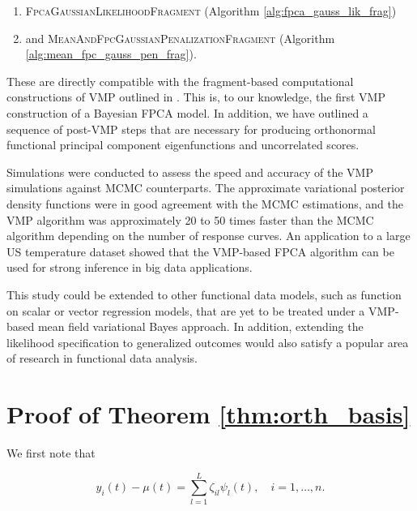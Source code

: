\documentclass[12pt]{article}
\theoremstyle{plain}
\theoremstyle{definition}
\theoremstyle{remark}
\begin{document}
\begin{enumerate}
	\item \textsc{FpcaGaussianLikelihoodFragment} (Algorithm \ref{alg:fpca_gauss_lik_frag})
	\item and \textsc{MeanAndFpcGaussianPenalizationFragment} (Algorithm \ref{alg:mean_fpc_gauss_pen_frag}).
\end{enumerate}

\noindent These are directly compatible with the fragment-based computational constructions of VMP outlined in
. This is, to our knowledge, the first VMP construction of a Bayesian FPCA model. In addition,
we have outlined a sequence of post-VMP steps that are necessary for producing orthonormal functional
principal component eigenfunctions and uncorrelated scores.

Simulations were conducted to assess the speed and accuracy of the VMP simulations against MCMC
counterparts. The approximate variational  posterior density functions were in good agreement with the
MCMC estimations, and the VMP algorithm was approximately 20 to 50 times faster than the MCMC
algorithm depending on the number of response curves. An application to a large US temperature dataset
showed that the VMP-based FPCA algorithm can be used for strong inference in big data applications.

This study could be extended to other
functional data models, such as function on scalar or vector regression models, that are yet to be treated
under a VMP-based mean field variational Bayes approach. In addition, extending the likelihood specification to
generalized outcomes would also satisfy a popular area of research in functional data analysis.





\appendix


\section{Proof of Theorem \ref{thm:orth_basis}}
\label{app:proof_thm_orth_basis}

We first note that

\begin{equation}
	y_i (t) - \mu (t) = \sum_{l=1}^L \zeta_{il} \psi_l (t), \quad i = 1, \dots, n.
\label{centered_kl_expansion}
\end{equation}
\end{document}
